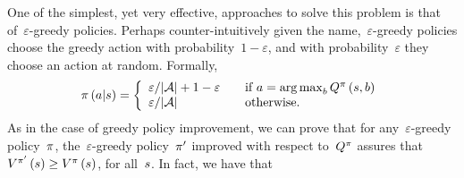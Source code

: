One of the simplest, yet very effective, approaches to solve this problem is that of~{$\varepsilon$-greedy} policies. Perhaps counter-intuitively given the name,~{${\varepsilon}$-greedy} policies choose the greedy action with probability~${1-\varepsilon}$, and with probability~${\varepsilon}$ they choose an action at random. Formally,
\begin{equation}
	\policy\left(\action\middle\vert\state\right)=\left\{
		\begin{array}{ll}
			\varepsilon/\lvert\actionspace\rvert+1-\varepsilon & \quad \textnormal{if}~\action=\argmax_{\varaction}\actionvalue\policyscript\left(\state,\varaction\right) \\
			\varepsilon/\lvert\actionspace\rvert & \quad \textnormal{otherwise}.
		\end{array}
	\right.
\end{equation}
As in the case of greedy policy improvement, we can prove that for any~{${\varepsilon}$-greedy} policy~${\pi}$, the~{${\varepsilon}$-greedy} policy~${\pi'}$ improved with respect to~${Q^{\pi}}$ assures that~${\statevalue\script{\policy'}\left(\state\right)\geq\statevalue\policyscript\left(\state\right)}$, for all~${\state}$. In fact, we have that
